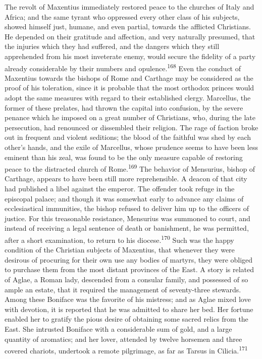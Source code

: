 The revolt of Maxentius immediately restored peace to the
churches of Italy and Africa; and the same tyrant who oppressed
every other class of his subjects, showed himself just, humane,
and even partial, towards the afflicted Christians. He depended
on their gratitude and affection, and very naturally presumed,
that the injuries which they had suffered, and the dangers which
they still apprehended from his most inveterate enemy, would
secure the fidelity of a party already considerable by their
numbers and opulence.\textsuperscript{168} Even the conduct of Maxentius towards
the bishops of Rome and Carthage may be considered as the proof
of his toleration, since it is probable that the most orthodox
princes would adopt the same measures with regard to their
established clergy. Marcellus, the former of these prelates, had
thrown the capital into confusion, by the severe penance which he
imposed on a great number of Christians, who, during the late
persecution, had renounced or dissembled their religion. The rage
of faction broke out in frequent and violent seditions; the blood
of the faithful was shed by each other’s hands, and the exile of
Marcellus, whose prudence seems to have been less eminent than
his zeal, was found to be the only measure capable of restoring
peace to the distracted church of Rome.\textsuperscript{169} The behavior of
Mensurius, bishop of Carthage, appears to have been still more
reprehensible. A deacon of that city had published a libel
against the emperor. The offender took refuge in the episcopal
palace; and though it was somewhat early to advance any claims of
ecclesiastical immunities, the bishop refused to deliver him up
to the officers of justice. For this treasonable resistance,
Mensurius was summoned to court, and instead of receiving a legal
sentence of death or banishment, he was permitted, after a short
examination, to return to his diocese.\textsuperscript{170} Such was the happy
condition of the Christian subjects of Maxentius, that whenever
they were desirous of procuring for their own use any bodies of
martyrs, they were obliged to purchase them from the most distant
provinces of the East. A story is related of Aglae, a Roman lady,
descended from a consular family, and possessed of so ample an
estate, that it required the management of seventy-three
stewards. Among these Boniface was the favorite of his mistress;
and as Aglae mixed love with devotion, it is reported that he was
admitted to share her bed. Her fortune enabled her to gratify the
pious desire of obtaining some sacred relics from the East. She
intrusted Boniface with a considerable sum of gold, and a large
quantity of aromatics; and her lover, attended by twelve horsemen
and three covered chariots, undertook a remote pilgrimage, as far
as Tarsus in Cilicia.\textsuperscript{171}

